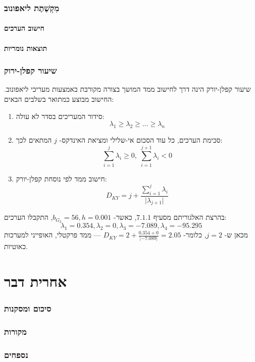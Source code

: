 \documentclass{article}
\begin{document}
\subsubsection{מִקְשֶׁתֶת ליאפונוב}
\paragraph{חישוב הערכים}
\paragraph{תוצאות נומריות}
\subsubsection{שיעור קפלן-ירוק}
שיעור קפלן-יורק הינה דרך לחישוב ממד המושך בצורה מקורבת באמצעות מעריכי ליאפונוב. החישוב מבוצע כמתואר בשלבים הבאים:
\begin{enumerate}
    \item סידור המעריכים בסדר לא עולה: \[\lambda_1\geq\lambda_2\geq\ldots\geq\lambda_n\]
    \item סכימת הערכים, כל עוד הסכום אי-שלילי ומציאת האינדקס- \(j\) המתאים לכך: \[\sum_{i=1}^{j}\lambda_i\geq0,\;\sum_{i=1}^{j+1}\lambda_i<0\]
    \item חישוב ממד לפי נוסחת קפלן-יורק: \[D_{KY}=j+\frac{\sum\limits_{i=1}^{j}\lambda_i}{\lvert\lambda_{j+1}\rvert}\]
\end{enumerate}
בהרצת האלגוריתם מסעיף \(7.1.1\), כאשר- \(b_{G_2}=56,h=0.001\), התקבלו הערכים:
\[\lambda_1=0.354,\lambda_2=0,\lambda_3=-7.089,\lambda_4=-95.295\]
מכאן ש- \(j=2\), כלומר- \(D_{KY}=2+\frac{0.354+0}{\lvert-7.089\rvert}=2.05\) — ממד פרקטלי, האופייני למערכות כאוטיות.

\newpage
\section{אחרית דבר}
\subsubsection*{סיכום ומסקנות}
\subsubsection*{מקורות}
\nocite{*}
\begin{otherlanguage}{English}
\printbibliography[heading=none]
\end{otherlanguage}
\subsubsection*{נספחים}
\end{document}

